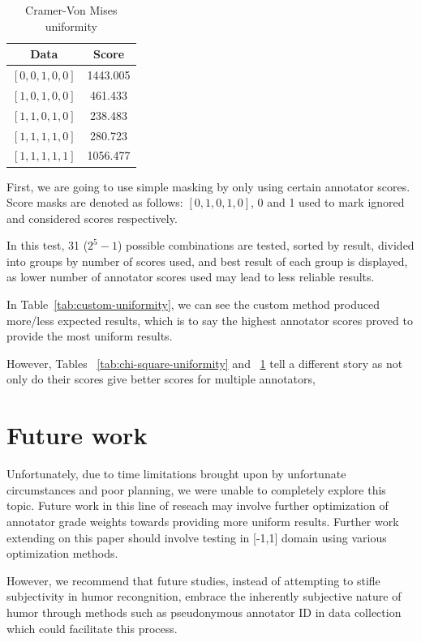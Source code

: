 \documentclass[10pt, a4paper]{article}
\begin{document}
\begin{table}[ht]
\centering
\caption{Cramer-Von Mises uniformity}
\begin{tabular}{|c|c|}
\hline
Data & Score \\
\hline
$[0, 0, 1, 0, 0]$ & 1443.005 \\
$[1, 0, 1, 0, 0]$ & 461.433 \\
$[1, 1, 0, 1, 0]$ & 238.483 \\
$[1, 1, 1, 1, 0]$ & 280.723 \\
$[1, 1, 1, 1, 1]$ & 1056.477 \\
\hline
\end{tabular}
\label{tab:cramer-von-mises-uniformity}
\end{table}

First, we are going to use simple masking by only using certain annotator scores. Score masks are denoted as follows:
$[0,1,0,1,0]$, 0 and 1 used to mark ignored and considered scores respectively.

In this test, 31 ($2^5 -1 $) possible combinations are tested, sorted by result, divided into groups by number of scores used, and best result of each group is displayed, as lower number of annotator scores used may lead to less reliable results.

In Table~\ref{tab:custom-uniformity}, we can see the custom method produced more/less expected  results, which is to say the highest annotator scores proved to provide the most uniform results.

However, Tables ~\ref{tab:chi-square-uniformity} and ~\ref{tab:cramer-von-mises-uniformity} tell a different story as not only do their scores give better scores for multiple annotators, 
\section{Future work}
Unfortunately, due to time limitations brought upon by unfortunate circumstances and poor planning, we were unable to completely explore this topic. Future work in this line of reseach may involve further optimization of annotator grade weights towards providing more uniform results.
Further work extending on this paper should involve testing in [-1,1] domain using various optimization methods.

However, we recommend that future studies, instead of attempting to stifle subjectivity in humor recongnition, embrace the inherently subjective nature of humor through methods such as pseudonymous annotator ID in data collection which could facilitate this process.
\end{document}
